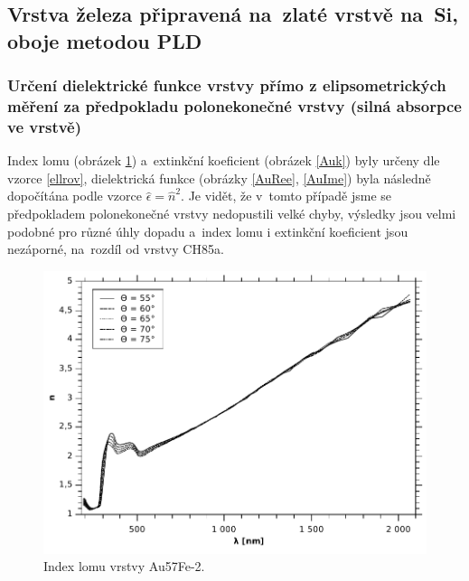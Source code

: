 \documentclass[12pt]{article}
\begin{document}
\newpage

\subsection{Vrstva železa připravená na~zlaté vrstvě na~Si, oboje metodou PLD}
\subsubsection{Určení dielektrické funkce vrstvy přímo z elipsometrických měření za předpokladu polonekonečné vrstvy (silná absorpce ve vrstvě)}

Index lomu (obrázek \ref{Aun}) a~extinkční koeficient (obrázek \ref{Auk}) byly určeny dle vzorce \ref{ellrov}, dielektrická funkce (obrázky \ref{AuRee}, \ref{AuIme}) byla následně dopočítána podle vzorce $\hat{\epsilon} = \hat{n}^2$. Je vidět, že v~tomto případě jsme se předpokladem polonekonečné vrstvy nedopustili velké chyby, výsledky jsou velmi podobné pro různé úhly dopadu a~index lomu i extinkční koeficient jsou nezáporné, na~rozdíl od vrstvy CH85a.

\begin{figure}
  \centering
  \includegraphics[width=135mm]{img/Au-n.pdf}
  \caption{Index lomu vrstvy Au57Fe-2.}
  \label{Aun}
\end{figure}
\end{document}
